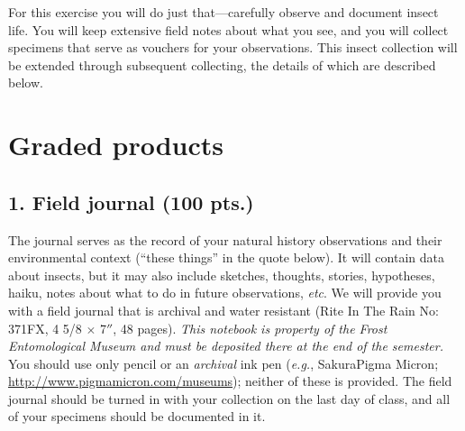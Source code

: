 \documentclass[letterpaper, 11pt]{article}
\begin{document}
\noindent{}For this exercise you will do just that---carefully observe and document insect life. You will keep extensive field notes about what you see, and you will collect specimens that serve as vouchers for your observations. This insect collection will be extended through subsequent collecting, the details of which are described below.

\section*{Graded products}

\subsection*{1. Field journal (100 pts.)}
The journal serves as the record of your natural history observations and their environmental context (``these things'' in the quote below). It will contain data about insects, but it may also include sketches, thoughts, stories, hypotheses, haiku, notes about what to do in future observations, \textit{etc}. We will provide you with a field journal that is archival and water resistant (Rite In The Rain No: 371FX, 4 5/8 $\times$ 7$''$, 48 pages). \textit{This notebook is property of the Frost Entomological Museum and must be deposited there at the end of the semester.} You should use only pencil or an \textit{archival} ink pen (\textit{e.g.}, Sakura\textregistered{ }Pigma Micron\textregistered; \url{http://www.pigmamicron.com/museums}); neither of these is provided. The field journal should be turned in with your collection on the last day of class, and all of your specimens should be documented in it.
\end{document}
